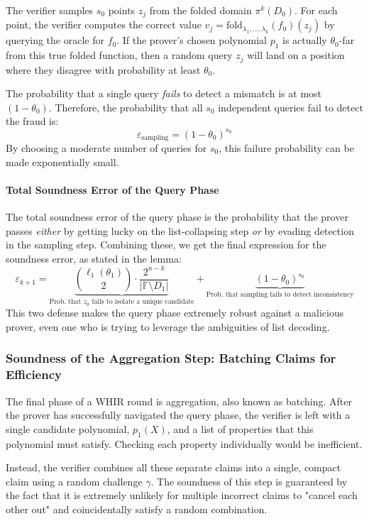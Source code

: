 \documentclass{article}
\begin{document}
The verifier samples $s_0$ points $z_j$ from the folded domain $\pi^k(D_0)$. For each point, the verifier computes the correct value $v_j = \text{fold}_{\lambda_1, \dots, \lambda_k}(f_0)(z_j)$ by querying the oracle for $f_0$. If the prover's chosen polynomial $p_1$ is actually $\theta_0$-far from this true folded function, then a random query $z_j$ will land on a position where they disagree with probability at least $\theta_0$.

The probability that a single query \textit{fails} to detect a mismatch is at most $(1-\theta_0)$. Therefore, the probability that all $s_0$ independent queries fail to detect the fraud is:
\[
\varepsilon_{\text{sampling}} = (1-\theta_0)^{s_0}
\]
By choosing a moderate number of queries for $s_0$, this failure probability can be made exponentially small.

\paragraph{Total Soundness Error of the Query Phase}
The total soundness error of the query phase is the probability that the prover passes \textit{either} by getting lucky on the list-collapsing step \textit{or} by evading detection in the sampling step. Combining these, we get the final expression for the soundness error, as stated in the lemma:
\[
\varepsilon_{k+1} = \underbrace{\binom{\ell_1(\theta_1)}{2} \cdot \frac{2^{n-k}}{|\mathbb{F} \setminus D_1|}}_{\text{Prob. that } z_0 \text{ fails to isolate a unique candidate}} + \underbrace{(1-\theta_0)^{s_0}}_{\text{Prob. that sampling fails to detect inconsistency}}
\]
This two defense makes the query phase extremely robust against a malicious prover, even one who is trying to leverage the ambiguities of list decoding.







\subsubsection{Soundness of the Aggregation Step: Batching Claims for Efficiency}
The final phase of a WHIR round is aggregation, also known as batching. After the prover has successfully navigated the query phase, the verifier is left with a single candidate polynomial, $p_1(X)$, and a list of properties that this polynomial must satisfy. Checking each property individually would be inefficient.

Instead, the verifier combines all these separate claims into a single, compact claim using a random challenge $\gamma$. The soundness of this step is guaranteed by the fact that it is extremely unlikely for multiple incorrect claims to "cancel each other out" and coincidentally satisfy a random combination.
\end{document}
